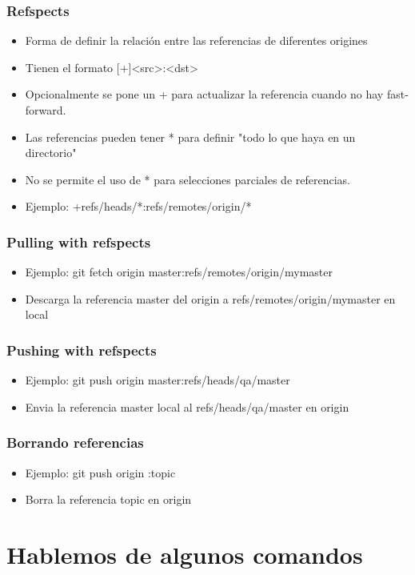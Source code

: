 \documentclass[10pt]{beamer}
\begin{document}
  \begin{frame}
    \frametitle{Refspects}
    \begin{itemize}
        \item Forma de definir la relación entre las referencias de diferentes origines
        \item Tienen el formato [+]<src>:<dst>
        \item Opcionalmente se pone un + para actualizar la referencia cuando no hay fast-forward.
        \item Las referencias pueden tener * para definir "todo lo que haya en un directorio"
        \item No se permite el uso de * para selecciones parciales de referencias.
        \item Ejemplo: +refs/heads/*:refs/remotes/origin/*
    \end{itemize}
  \end{frame}

  \begin{frame}
    \frametitle{Pulling with refspects}
    \begin{itemize}
        \item Ejemplo: git fetch origin master:refs/remotes/origin/mymaster
        \item Descarga la referencia master del origin a refs/remotes/origin/mymaster en local
    \end{itemize}
  \end{frame}

  \begin{frame}
    \frametitle{Pushing with refspects}
    \begin{itemize}
        \item Ejemplo: git push origin master:refs/heads/qa/master
        \item Envia la referencia master local al refs/heads/qa/master en origin
    \end{itemize}
  \end{frame}

  \begin{frame}
    \frametitle{Borrando referencias}
    \begin{itemize}
        \item Ejemplo: git push origin :topic
        \item Borra la referencia topic en origin
    \end{itemize}
  \end{frame}

  \section*{Hablemos de algunos comandos}
\end{document}
